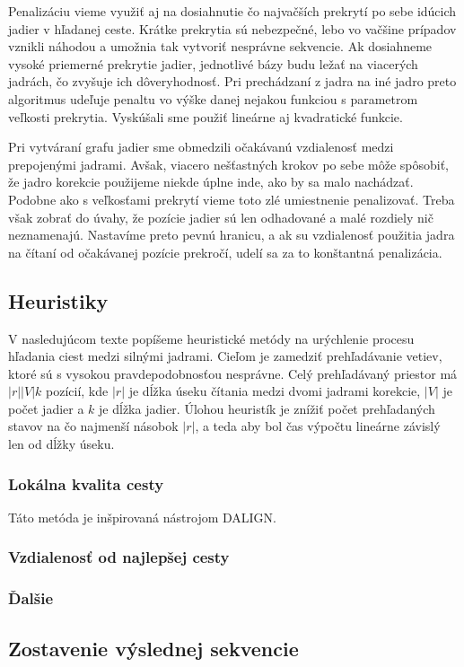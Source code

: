 Penalizáciu vieme využiť aj na dosiahnutie čo najvačších prekrytí po sebe idúcich jadier v hľadanej ceste. Krátke prekrytia sú nebezpečné, lebo vo vačšine prípadov vznikli náhodou a umožnia tak vytvoriť nesprávne sekvencie. Ak dosiahneme vysoké priemerné prekrytie jadier, jednotlivé bázy budu ležať na viacerých jadrách, čo zvyšuje ich dôveryhodnosť. Pri prechádzaní z jadra na iné jadro preto algoritmus udeľuje penaltu vo výške danej nejakou funkciou s parametrom veľkosti prekrytia. Vyskúšali sme použiť lineárne aj kvadratické funkcie.

Pri vytváraní grafu jadier sme obmedzili očakávanú vzdialenosť medzi prepojenými jadrami. Avšak, viacero nešťastných krokov po sebe môže spôsobiť, že jadro korekcie použijeme niekde úplne inde, ako by sa malo nachádzať. Podobne ako s veľkosťami prekrytí vieme toto zlé umiestnenie penalizovať. Treba však zobrať do úvahy, že pozície jadier sú len odhadované a malé rozdiely nič neznamenajú. Nastavíme preto pevnú hranicu, a ak su vzdialenosť použitia jadra na čítaní od očakávanej pozície prekročí, udelí sa za to konštantná penalizácia.

\subsection{Heuristiky}

V nasledujúcom texte popíšeme heuristické metódy na urýchlenie procesu hľadania ciest medzi silnými jadrami. Cieľom je zamedziť prehľadávanie vetiev, ktoré sú s vysokou pravdepodobnosťou nesprávne. Celý prehľadávaný priestor má $|r||V|k$ pozícií, kde $|r|$ je dĺžka úseku čítania medzi dvomi jadrami korekcie, $|V|$ je počet jadier a $k$ je dĺžka jadier. Úlohou heuristík je znížiť počet prehľadaných stavov na čo najmenší násobok $|r|$, a teda aby bol čas výpočtu lineárne závislý len od dĺžky úseku.

\subsubsection{Lokálna kvalita cesty}

Táto metóda je inšpirovaná nástrojom DALIGN. 

\subsubsection{Vzdialenosť od najlepšej cesty}

\subsubsection{Ďalšie}

\subsection{Zostavenie výslednej sekvencie}
